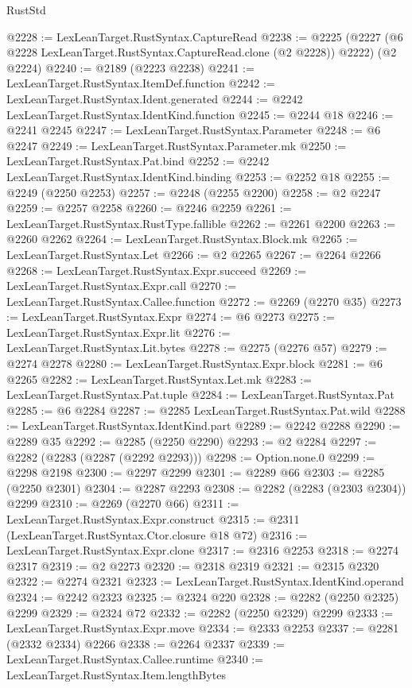 \begin{lexlean}{RustStd}
\begin{coremodule}
@2228 := LexLeanTarget.RustSyntax.CaptureRead
@2238 := @2225
    (@2227 (@6 @2228 LexLeanTarget.RustSyntax.CaptureRead.clone (@2 @2228)) @2222)
    (@2 @2224)
@2240 := @2189 (@2223 @2238)
@2241 := LexLeanTarget.RustSyntax.ItemDef.function
@2242 := LexLeanTarget.RustSyntax.Ident.generated
@2244 := @2242 LexLeanTarget.RustSyntax.IdentKind.function
@2245 := @2244 @18
@2246 := @2241 @2245
@2247 := LexLeanTarget.RustSyntax.Parameter
@2248 := @6 @2247
@2249 := LexLeanTarget.RustSyntax.Parameter.mk
@2250 := LexLeanTarget.RustSyntax.Pat.bind
@2252 := @2242 LexLeanTarget.RustSyntax.IdentKind.binding
@2253 := @2252 @18
@2255 := @2249 (@2250 @2253)
@2257 := @2248 (@2255 @2200)
@2258 := @2 @2247
@2259 := @2257 @2258
@2260 := @2246 @2259
@2261 := LexLeanTarget.RustSyntax.RustType.fallible
@2262 := @2261 @2200
@2263 := @2260 @2262
@2264 := LexLeanTarget.RustSyntax.Block.mk
@2265 := LexLeanTarget.RustSyntax.Let
@2266 := @2 @2265
@2267 := @2264 @2266
@2268 := LexLeanTarget.RustSyntax.Expr.succeed
@2269 := LexLeanTarget.RustSyntax.Expr.call
@2270 := LexLeanTarget.RustSyntax.Callee.function
@2272 := @2269 (@2270 @35)
@2273 := LexLeanTarget.RustSyntax.Expr
@2274 := @6 @2273
@2275 := LexLeanTarget.RustSyntax.Expr.lit
@2276 := LexLeanTarget.RustSyntax.Lit.bytes
@2278 := @2275 (@2276 @57)
@2279 := @2274 @2278
@2280 := LexLeanTarget.RustSyntax.Expr.block
@2281 := @6 @2265
@2282 := LexLeanTarget.RustSyntax.Let.mk
@2283 := LexLeanTarget.RustSyntax.Pat.tuple
@2284 := LexLeanTarget.RustSyntax.Pat
@2285 := @6 @2284
@2287 := @2285 LexLeanTarget.RustSyntax.Pat.wild
@2288 := LexLeanTarget.RustSyntax.IdentKind.part
@2289 := @2242 @2288
@2290 := @2289 @35
@2292 := @2285 (@2250 @2290)
@2293 := @2 @2284
@2297 := @2282 (@2283 (@2287 (@2292 @2293)))
@2298 := Option.none.{0}
@2299 := @2298 @2198
@2300 := @2297 @2299
@2301 := @2289 @66
@2303 := @2285 (@2250 @2301)
@2304 := @2287 @2293
@2308 := @2282 (@2283 (@2303 @2304)) @2299
@2310 := @2269 (@2270 @66)
@2311 := LexLeanTarget.RustSyntax.Expr.construct
@2315 := @2311 (LexLeanTarget.RustSyntax.Ctor.closure @18 @72)
@2316 := LexLeanTarget.RustSyntax.Expr.clone
@2317 := @2316 @2253
@2318 := @2274 @2317
@2319 := @2 @2273
@2320 := @2318 @2319
@2321 := @2315 @2320
@2322 := @2274 @2321
@2323 := LexLeanTarget.RustSyntax.IdentKind.operand
@2324 := @2242 @2323
@2325 := @2324 @220
@2328 := @2282 (@2250 @2325) @2299
@2329 := @2324 @72
@2332 := @2282 (@2250 @2329) @2299
@2333 := LexLeanTarget.RustSyntax.Expr.move
@2334 := @2333 @2253
@2337 := @2281 (@2332 @2334) @2266
@2338 := @2264 @2337
@2339 := LexLeanTarget.RustSyntax.Callee.runtime
@2340 := LexLeanTarget.RustSyntax.Item.lengthBytes

\end{coremodule}
\end{lexlean}
